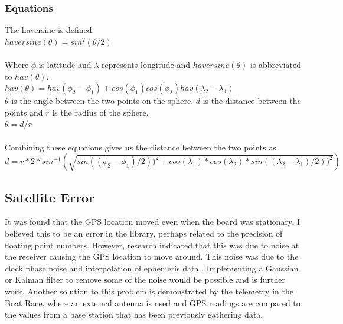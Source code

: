 \documentclass[12pt,a4paper]{report}
\begin{document}
\subsubsection{Equations}
The haversine is defined: \\
$haversine(\theta) = sin^2(\theta/2)$ \\ \\ 
Where $\phi$ is latitude and $\lambda$ represents longitude and $haversine(\theta)$ is abbreviated to $hav(\theta)$. \\
$hav(\theta) = hav(\phi_2 - \phi_1) + cos(\phi_1) cos(\phi_2) hav(\lambda_2 - \lambda_1)$ \\
$\theta$ is the angle between the two points on the sphere. $d$ is the distance between the points and $r$ is the radius of the sphere. \\
$\theta = d / r$ \\ \\ 
Combining these equations gives us the distance between the two points as \\
$d = r * 2 * sin^{-1}(\sqrt{sin((\phi_2 - \phi_1)/2))^2 + cos(\lambda_1) * cos(\lambda_2) * sin((\lambda_2 - \lambda_1)/2))^2})$

\subsection{Satellite Error}
It was found that the GPS location moved even when the board was stationary. I believed this to be an error in the library, perhaps related to the precision of floating point numbers. However, research indicated that this was due to noise at the receiver causing the GPS location to move around. This noise was due to the clock phase noise and interpolation of ephemeris data \cite{satellite}. Implementing a Gaussian or Kalman filter to remove some of the noise would be possible and is further work. Another solution to this problem is demonstrated by the telemetry in the Boat Race, where an external antenna is used and GPS readings are compared to the values from a base station that has been previously gathering data.  %
 
\end{document}
